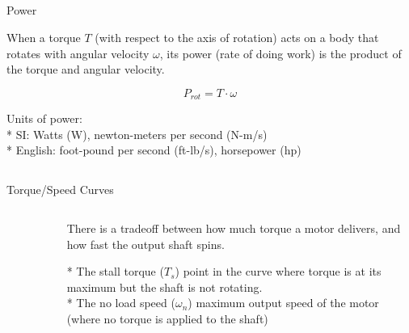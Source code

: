 \subsection{}
{
\begin{frame}{Power}

When a torque $T$ (with respect to the axis of rotation) acts 
on a body that rotates with angular velocity $\omega$,
its power (rate of doing work) is the product of the torque
and angular velocity. 

\begin{equation*}
P_{rot}= T \cdot \omega
\end{equation*}

Units of power: \\
* SI: Watts (W), newton-meters per second (N-m/s) \\
* English: foot-pound per second (ft-lb/s), horsepower (hp)

\end{frame}
}


\subsection{}
{
\begin{frame}{Torque/Speed Curves}

\begin{columns}
\begin{column}{0.4\textwidth}  %

	\vspace{-3mm}
   	\begin{figure}
 	\end{figure}

\end{column}

\begin{column}{0.6\textwidth}

There is a tradeoff between how much torque a motor delivers, 
and how fast the output shaft spins. 

* The stall torque ($T_s$) point in the curve where
torque is at its maximum but the shaft is not rotating. \\
* The no load speed ($\omega_n$) maximum output speed
of the motor (where no torque is applied to the shaft)


\end{column}

\end{columns}

\end{frame}
}



